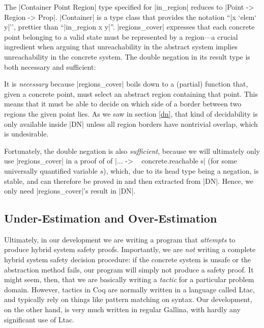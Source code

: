\documentclass[runningheads]{llncs}
\begin{document}
The |Container Point Region| type specified for |in_region| reduces to
|Point -> Region -> Prop|. |Container| is a type class that provides
the notation ``|x `elem` y|'', prettier than ``|in_region x
y|''. |regions_cover| expresses that each concrete point belonging to
a valid state must be represented by a region---a crucial ingredient
when arguing that unreachability in the abstract system implies
unreachability in the concrete system. The double negation in its
result type is both necessary and sufficient:

It is \emph{necessary} because |regions_cover| boils down to a
(partial) function that, given a concrete point, must select an
abstract region containing that point. This means that it must be able
to decide on which side of a border between two regions the given
point lies. As we saw in section \ref{dn}, that kind of decidability
is only available inside |DN| unless all region borders have
nontrivial overlap, which 
is undesirable.

Fortunately, the double negation is also \emph{sufficient}, because we
will ultimately only use |regions_cover| in a proof of of |... -> ~
concrete.reachable s| (for some universally quantified variable $s$),
which, due to its head type being a negation, is stable, and can
therefore be proved in and then extracted from |DN|. Hence, we only
need |regions_cover|'s result in |DN|.

\subsection{Under-Estimation and Over-Estimation}
\label{estimation}

Ultimately, in our development we are writing a program that
\emph{attempts} to produce hybrid system safety proofs. Importantly,
we are \emph{not} writing a complete hybrid system safety decision
procedure: if the concrete system is unsafe or the abstraction method
fails, our program will simply not produce a safety proof. It might
seem, then, that we are basically writing a \emph{tactic} for a
particular problem domain. However, tactics in Coq are normally
written in a language called Ltac, and typically rely on things like
pattern matching on syntax. Our development, on the other hand, is
very much written in regular Gallina, with hardly any significant use
of Ltac. 
\end{document}
